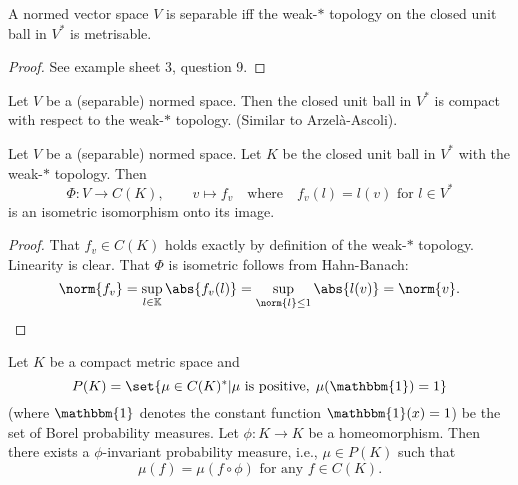 \documentclass{article}
\newcommand{\K}{\mathbb{K}}
\begin{document}
\begin{thm}
    A normed vector space $V$ is separable iff the weak-$*$ topology on the closed unit ball in $V^*$ is metrisable.
\end{thm}

\begin{proof}
    See example sheet 3, question 9.
\end{proof}

\begin{thm}
    Let $V$ be a (separable) normed space.
    Then the closed unit ball in $V^*$ is compact with respect to the weak-$*$ topology. (Similar to Arzel\`a-Ascoli).
\end{thm}

\begin{thm}
    Let $V$ be a (separable) normed space. Let $K$ be the closed unit ball in $V^*$ with the weak-$*$ topology.
    Then
    \begin{equation*}
        \Phi: V \to C(K), \qquad v \mapsto f_v \quad \text{where} \quad f_v(l) = l(v) \text{ for } l \in V^*
    \end{equation*}
    is an isometric isomorphism onto its image.
\end{thm}

\begin{proof}
    That $f_v \in C(K)$ holds exactly by definition of the weak-$*$ topology.
    Linearity is clear. That $\Phi$ is isometric follows from Hahn-Banach:
    \begin{equation*}
        \norm{f_v} = \sup_{l \in \K} \abs{f_v(l)} = \sup_{\norm{l} \leq 1} \abs{l(v)} = \norm{v}. \qedhere
    \end{equation*}
\end{proof}

\begin{eg}
    Let $K$ be a compact metric space and
    \begin{equation*}
        P(K) = \set{\mu \in C(K)^* | \mu \text{ is positive}, \; \mu(\mathbbm{1}) = 1}
    \end{equation*}
    (where $\mathbbm{1}$ denotes the constant function $\mathbbm{1}(x) = 1$) be the set of Borel probability measures.
    Let $\phi: K \to K$ be a homeomorphism. Then there exists a $\phi$-invariant probability measure, i.e., $\mu \in P(K)$ such that
    \begin{equation*}
        \mu(f) = \mu(f \circ \phi) \text{ for any }f \in C(K).
    \end{equation*}
\end{eg}
\end{document}
